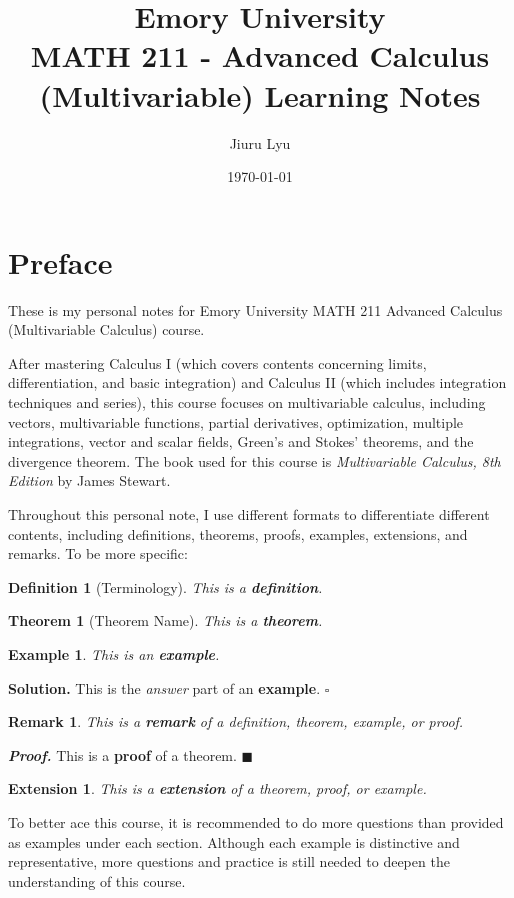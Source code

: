 \documentclass[12pt,a4paper]{article}
\title{Emory University\\\textbf{MATH 211 - Advanced Calculus (Multivariable) Learning Notes}}
\author{Jiuru Lyu}
\date{\today}
\newtheorem{thm}{Theorem}[subsection]
\newtheorem{df}{Definition}[subsection]
\newtheorem{eg}{Example}[subsection]
\newenvironment*{sol}{\par\indent\textbf{Solution. }}{\hfill{$\square$}\par}
\newtheorem*{rmk}{\indent Remark}
\newenvironment*{prf}{\par\indent\textbf{\textit{Proof. }}}{\hfill $\blacksquare$\par}
\newtheorem*{ext}{\indent Extension}
\begin{document}
\maketitle
\tableofcontents
\newpage

\section*{Preface}
These is my personal notes for Emory University MATH 211 Advanced Calculus (Multivariable Calculus) course. 

After mastering Calculus I (which covers contents concerning limits, differentiation, and basic integration) and Calculus II (which includes integration techniques and series), this course focuses on multivariable calculus, including vectors, multivariable functions, partial derivatives, optimization, multiple integrations, vector and scalar fields, Green’s and Stokes’ theorems, and the divergence theorem. The book used for this course is \textit{Multivariable Calculus, 8th Edition} by James Stewart. 

Throughout this personal note, I use different formats to differentiate different contents, including definitions, theorems, proofs, examples, extensions, and remarks. To be more specific: 
\begin{df}[Terminology]
    This is a \textbf{definition}.	
\end{df}
\begin{thm}[Theorem Name]
    This is a \textbf{theorem}.	
\end{thm}
\begin{eg}
    This is  an \textbf{example}. 
\end{eg}

\begin{sol}
    This is the \textit{answer} part of an \textbf{example}. 
\end{sol}
\begin{rmk}
	This is a \textbf{remark} of a definition, theorem, example, or proof. 
\end{rmk}

\begin{prf}
	This is a \textbf{proof} of a theorem. 
\end{prf}
\begin{ext}
	This is a \textbf{extension} of a theorem, proof, or example. 	
\end{ext}
To better ace this course, it is recommended to do more questions than provided as examples under each section. Although each example is distinctive and representative, more questions and practice is still needed to deepen the understanding of this course. 
\end{document}
